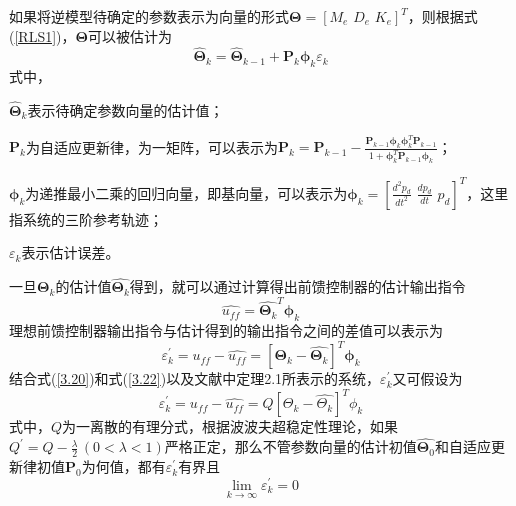 如果将逆模型待确定的参数表示为向量的形式$\symbf{\Theta}=[M_e\,\, D_e\,\, K_e]^{T}$，则根据式(\ref{RLS1})，$\symbf{\Theta}$可以被估计为
\begin{equation}
\label{3.20}
\hat{\symbf{\Theta}}_{k}=\hat{\symbf{\Theta}}_{k-1}+\symbf{P}_{k} \symbf{\phi}_{k}\varepsilon_{k}
\end{equation}
式中，

$\hat{\symbf{\Theta}}_{k}$表示待确定参数向量的估计值；

$\symbf{P}_k$为自适应更新律，为一矩阵，可以表示为$\symbf{P}_{k}=\symbf{P}_{k-1}-\frac{\symbf{P}_{k-1} \symbf{\phi}_{k} \symbf{\phi}_{k}^{T} \symbf{P}_{k-1}}{1+\symbf{\phi}_{k}^{T} \symbf{P}_{k-1}\symbf{\phi}_{k}}$；

$\symbf{\phi}_{k}$为递推最小二乘的回归向量，即基向量，可以表示为$\symbf{\phi}_{k}=\left[\frac{d^{2} p_d}{d t^{2}} \,\,\frac{d p_d}{d t} \,\,p_d \right]^{T}$，这里指系统的三阶参考轨迹；

$\varepsilon_{k}$表示估计误差。

一旦$\symbf{\Theta}_k$的估计值$\hat{\symbf{\Theta}_k}$得到，就可以通过计算得出前馈控制器的估计输出指令
\begin{equation}
\label{3.21}
\hat{u_{ff}}=\hat{\symbf{\Theta}_k}^{T}\symbf{\phi}_{k}
\end{equation}
理想前馈控制器输出指令与估计得到的输出指令之间的差值可以表示为
\begin{equation}
\label{3.22}
\varepsilon_{k}^{'}=u_{ff}-\hat{u_{ff}}=\left[\symbf{\Theta}_k-\hat{\symbf{\Theta}_k}\right]^{T}\symbf{\phi}_{k}
\end{equation}
结合式(\ref{3.20})和式(\ref{3.22})以及文献\cite{landau1980extension}中定理2.1所表示的系统，$\varepsilon_{k}^{'}$又可假设为
\begin{equation}
\label{3.23}
\varepsilon_{k}^{'}=u_{ff}-\hat{u_{ff}}=Q\left[\Theta_k-\hat{\Theta_{k}}\right]^{T}\phi_{k}
\end{equation}
式中，$Q$为一离散的有理分式，根据波波夫超稳定性理论\cite{landau1980extension}，如果$Q^{'}=Q-\frac{\lambda}{2}\,(0<\lambda<1)$严格正定，那么不管参数向量的估计初值$\hat{\symbf{\Theta}_0}$和自适应更新律初值$\symbf{P}_0$为何值，都有$\varepsilon_{k}^{'}$有界且
\begin{equation}
\label{3.24}
\lim _{k \rightarrow \infty} \varepsilon_{k}^{'}=0
\end{equation}

